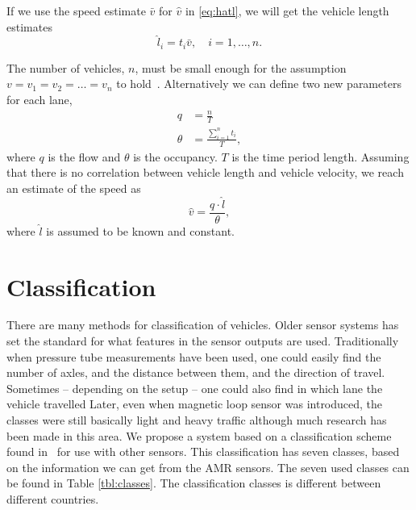 If we use the speed estimate $\bar{v}$ for $\hat{v}$ in \eqref{eq:hatl}, we will get the vehicle length estimates~\cite{coifman2001}
\begin{equation}
  \hat{l}_i = t_i \bar{v}, \quad i=1, \dots, n.
\end{equation}

The number of vehicles, $n$, must be small enough for the assumption $v = v_1 = v_2 = \ldots = v_n$ to hold~\cite{coifman2001}. Alternatively we can define two new parameters~\cite{coifman2000} for each lane,
\begin{align}
 q&=\frac{n}{T}\\
 \theta&=\frac{\sum_{i=1}^n t_i}{T},
\end{align}
where $q$ is the flow and $\theta$ is the occupancy. $T$ is the time period length. Assuming that there is no correlation between vehicle length and vehicle velocity, we reach an estimate of the speed as
\begin{equation}
 \hat{v} =  \frac{q\cdot{}\hat{l}}{\theta},
\end{equation}
where $\hat{l}$ is assumed to be known and constant. 

\section{Classification}
There are many methods for classification of vehicles. Older sensor systems has set the standard for what features in the sensor outputs are used. Traditionally when pressure tube measurements have been used, one could easily find the number of axles, and the distance between them, and the direction of travel. Sometimes -- depending on the setup -- one could also find in which lane the vehicle travelled Later, even when magnetic loop sensor was introduced, the classes were still basically light and heavy traffic although much research has been made in this area. We propose a system based on a classification scheme found in~\cite{sun2000} for use with other sensors. This classification has seven classes, based on the information we can get from the AMR sensors. The seven used classes can be found in Table \ref{tbl:classes}. The classification classes is different between different countries.

